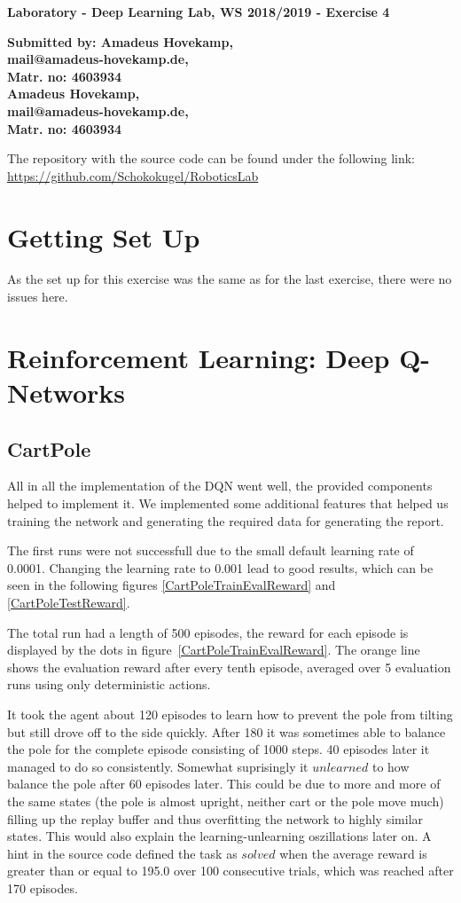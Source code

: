\documentclass[
        a4paper,
        10pt,
        parskip = full,    %
    ]{scrartcl}
\begin{document}
\textbf{\large{Laboratory - Deep Learning Lab, WS 2018/2019 - Exercise 4}}

\textbf{\large{Submitted by: Amadeus Hovekamp,\\
mail@amadeus-hovekamp.de,\\
Matr. no: 4603934\\
Amadeus Hovekamp,\\
mail@amadeus-hovekamp.de,\\
Matr. no: 4603934}}

The repository with the source code can be found under the following link:\\
\href{https://github.com/Schokokugel/RoboticsLab}
     {https://github.com/Schokokugel/RoboticsLab}


\section{Getting Set Up}

As the set up for this exercise was the same as for the last exercise, there were no issues here.

\section{Reinforcement Learning: Deep Q-Networks}

\subsection{CartPole}

All in all the implementation of the DQN went well, the provided components
helped to implement it. We implemented some additional features that helped us
training the network and generating the required data for generating the report.


The first runs were not successfull due to the small default learning
rate of 0.0001. Changing the learning rate to 0.001 lead to good results,
which can be seen in the following figures \ref{CartPoleTrainEvalReward}
and \ref{CartPoleTestReward}.


The total run had a length of 500 episodes, the reward for each episode is
displayed by the dots in figure~\ref{CartPoleTrainEvalReward}. The orange line
shows the evaluation reward after every tenth episode, averaged over 5 evaluation
runs using only deterministic actions.

It took the agent about 120 episodes to learn how to prevent the pole from tilting
but still drove off to the side quickly. After 180 it was sometimes able to
balance the pole for the complete episode consisting of 1000 steps. 40 episodes
later it managed to do so consistently. Somewhat suprisingly it $unlearned$ to
how balance the pole after 60 episodes later. This could be due to more and more
of the same states (the pole is almost upright, neither cart or the pole move much)
filling up the replay buffer and thus overfitting the network to highly similar
states. This would also explain the learning-unlearning oszillations later on.
A hint in the source code defined the task as $solved$ when the average reward is
greater than or equal to 195.0 over 100 consecutive trials, which was reached
after 170 episodes.
\end{document}
